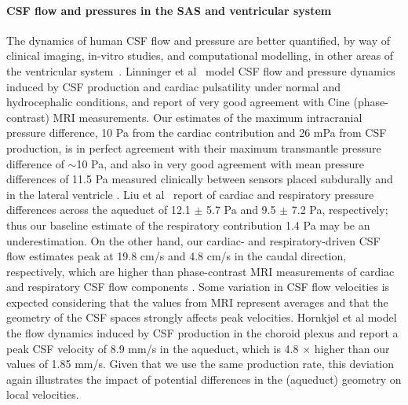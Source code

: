 \documentclass[fleqn,10pt]{wlscirep}
\begin{document}
\paragraph{CSF flow and pressures in the SAS and ventricular system}
The dynamics of human CSF flow and pressure are better quantified, by
way of clinical imaging, in-vitro studies, and computational
modelling, in other areas of the ventricular
system~\cite{linninger2007cerebrospinal, sweetman2011cerebrospinal,
  vinje2019respiratory, hornkjol2022csf, causemann2022human,
  karki2025real, liu2025transmantle}. Linninger et
al~\cite{linninger2007cerebrospinal} model CSF flow and pressure
dynamics induced by CSF production and cardiac pulsatility under
normal and hydrocephalic conditions, and report of very good agreement
with Cine (phase-contrast) MRI measurements. Our estimates of the
maximum intracranial pressure difference, 10 Pa from the cardiac
contribution and 26 mPa from CSF production, is in perfect agreement
with their maximum transmantle pressure difference of $\sim$10 Pa, and
also in very good agreement with mean pressure differences of 11.5 Pa
measured clinically between sensors placed subdurally and in the
lateral ventricle \cite{vinje2019respiratory}. Liu et
al~\cite{liu2025transmantle} report of cardiac and respiratory
pressure differences across the aqueduct of 12.1 $\pm$ 5.7 Pa and 9.5
$\pm$ 7.2 Pa, respectively; thus our baseline estimate of the respiratory contribution 1.4 Pa may be an
underestimation. On the other hand, our cardiac- and
respiratory-driven CSF flow estimates peak at 19.8 cm/s and 4.8 cm/s in the caudal direction, respectively, which are higher than phase-contrast MRI measurements of cardiac and respiratory CSF flow
components \cite{takizawa2017characterization, yildiz2017quantifying}. Some variation in CSF flow velocities is expected considering that the values from MRI represent averages
\cite{yildiz2017quantifying} and that the geometry of the CSF spaces
strongly affects peak velocities\cite{vinje2019respiratory,
  causemann2022human}. Hornkjøl et al \cite{hornkjol2022csf} model the
flow dynamics induced by CSF production in the choroid plexus and
report a peak CSF velocity of 8.9 mm/s in the aqueduct, which is 4.8
$\times$ higher than our values of 1.85 mm/s. Given that we use the
same production rate, this deviation again illustrates the impact of
potential differences in the (aqueduct) geometry on local velocities.

\end{document}
